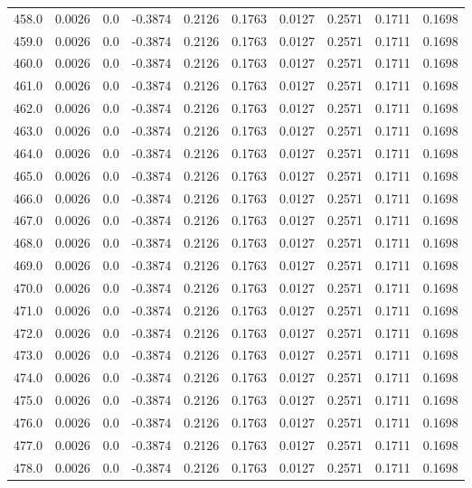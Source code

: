 \begin{longtable}{lrrrrrrrrr}
458.0 & 0.0026 & 0.0 & -0.3874 & 0.2126 & 0.1763 & 0.0127 & 0.2571 & 0.1711 & 0.1698 \\
459.0 & 0.0026 & 0.0 & -0.3874 & 0.2126 & 0.1763 & 0.0127 & 0.2571 & 0.1711 & 0.1698 \\
460.0 & 0.0026 & 0.0 & -0.3874 & 0.2126 & 0.1763 & 0.0127 & 0.2571 & 0.1711 & 0.1698 \\
461.0 & 0.0026 & 0.0 & -0.3874 & 0.2126 & 0.1763 & 0.0127 & 0.2571 & 0.1711 & 0.1698 \\
462.0 & 0.0026 & 0.0 & -0.3874 & 0.2126 & 0.1763 & 0.0127 & 0.2571 & 0.1711 & 0.1698 \\
463.0 & 0.0026 & 0.0 & -0.3874 & 0.2126 & 0.1763 & 0.0127 & 0.2571 & 0.1711 & 0.1698 \\
464.0 & 0.0026 & 0.0 & -0.3874 & 0.2126 & 0.1763 & 0.0127 & 0.2571 & 0.1711 & 0.1698 \\
465.0 & 0.0026 & 0.0 & -0.3874 & 0.2126 & 0.1763 & 0.0127 & 0.2571 & 0.1711 & 0.1698 \\
466.0 & 0.0026 & 0.0 & -0.3874 & 0.2126 & 0.1763 & 0.0127 & 0.2571 & 0.1711 & 0.1698 \\
467.0 & 0.0026 & 0.0 & -0.3874 & 0.2126 & 0.1763 & 0.0127 & 0.2571 & 0.1711 & 0.1698 \\
468.0 & 0.0026 & 0.0 & -0.3874 & 0.2126 & 0.1763 & 0.0127 & 0.2571 & 0.1711 & 0.1698 \\
469.0 & 0.0026 & 0.0 & -0.3874 & 0.2126 & 0.1763 & 0.0127 & 0.2571 & 0.1711 & 0.1698 \\
470.0 & 0.0026 & 0.0 & -0.3874 & 0.2126 & 0.1763 & 0.0127 & 0.2571 & 0.1711 & 0.1698 \\
471.0 & 0.0026 & 0.0 & -0.3874 & 0.2126 & 0.1763 & 0.0127 & 0.2571 & 0.1711 & 0.1698 \\
472.0 & 0.0026 & 0.0 & -0.3874 & 0.2126 & 0.1763 & 0.0127 & 0.2571 & 0.1711 & 0.1698 \\
473.0 & 0.0026 & 0.0 & -0.3874 & 0.2126 & 0.1763 & 0.0127 & 0.2571 & 0.1711 & 0.1698 \\
474.0 & 0.0026 & 0.0 & -0.3874 & 0.2126 & 0.1763 & 0.0127 & 0.2571 & 0.1711 & 0.1698 \\
475.0 & 0.0026 & 0.0 & -0.3874 & 0.2126 & 0.1763 & 0.0127 & 0.2571 & 0.1711 & 0.1698 \\
476.0 & 0.0026 & 0.0 & -0.3874 & 0.2126 & 0.1763 & 0.0127 & 0.2571 & 0.1711 & 0.1698 \\
477.0 & 0.0026 & 0.0 & -0.3874 & 0.2126 & 0.1763 & 0.0127 & 0.2571 & 0.1711 & 0.1698 \\
478.0 & 0.0026 & 0.0 & -0.3874 & 0.2126 & 0.1763 & 0.0127 & 0.2571 & 0.1711 & 0.1698 \\

\end{longtable}
